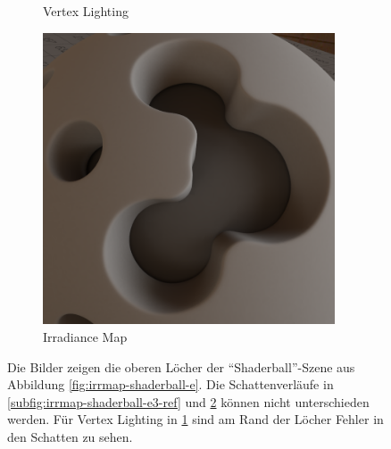 \begin{figure}[h]
\begin{subfigure}[t]{0.33\textwidth}
				\caption{Vertex Lighting}
				\label{subfig:irrmap-shaderball-e3-vmap}
			\end{subfigure}
			\begin{subfigure}[t]{0.33\textwidth}
				\center
				\includegraphics[width=0.95\textwidth]{pic/irrmap-shaderball_e3-irrmap.png}
				\caption{Irradiance Map}
				\label{subfig:irrmap-shaderball-e3-irrmap}
			\end{subfigure}
			\caption[Irradiance-Map der \enquote{Shaderball}-Szene mit der \enquote{Ennis-Brown House}-HDR in den Löchern]{Die Bilder zeigen die oberen Löcher der \enquote{Shaderball}-Szene aus Abbildung \ref{fig:irrmap-shaderball-e}. Die Schattenverläufe in \ref{subfig:irrmap-shaderball-e3-ref} und \ref{subfig:irrmap-shaderball-e3-irrmap} können nicht unterschieden werden. Für Vertex Lighting in \ref{subfig:irrmap-shaderball-e3-vmap} sind am Rand der Löcher Fehler in den Schatten zu sehen.}
			\label{fig:irrmap-shaderball-e3}
		\end{figure}

